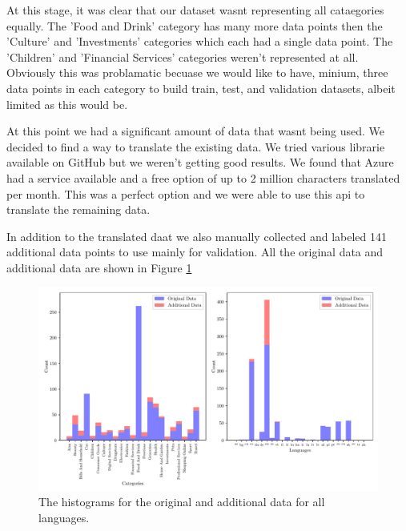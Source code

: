 At this stage, it was clear that our dataset wasnt representing all cataegories equally. The 'Food and Drink' category has many more data points then the 'Culture' and 'Investments' categories which each had a single data point. The 'Children' and 'Financial Services' categories weren't represented at all. Obviously this was problamatic becuase we would like to have, minium, three data points in each category to build train, test, and validation datasets, albeit limited as this would be.

At this point we had a significant amount of data that wasnt being used. We decided to find a way to translate the existing data. We tried various librarie available on GitHub but we weren't getting good results. We found that Azure had a service available and a free option of up to 2 million characters translated per month. This was a perfect option and we were able to use this api to translate the remaining data.

In addition to the translated daat we also manually collected and labeled 141 additional data points to use mainly for validation. All the original data and additional data are shown in Figure \ref{fig:all_hist}
\begin{figure}[!ht]
  \centering
  \includegraphics[width=\textwidth]{../img/plot_all_hist.pdf}
  \caption{The histograms for the original and additional data for all languages.}
  \label{fig:all_hist}
\end{figure}


